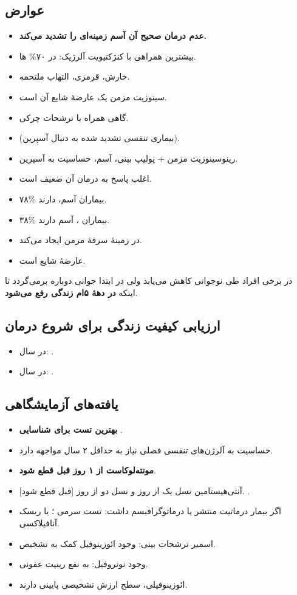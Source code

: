 \documentclass[12pt,a4paper]{article}
\begin{document}
\subsection*{عوارض }
\begin{itemize}
\item \textbf{عدم درمان صحیح آن آسم زمینه‌ای را تشدید می‌کند.}
\item بیشترین همراهی با کنژکتیویت آلرژیک: در ۷۰\% ها.
\item خارش، قرمزی، التهاب ملتحمه.
\item سینوزیت مزمن یک عارضهٔ شایع آن است.
\item گاهی همراه با ترشحات چرکی.
\item \textbf{} (بیماری تنفسی تشدید شده به دنبال آسپرین).
\item رینوسینوزیت مزمن + پولیپ بینی، آسم، حساسیت به آسپرین.
\item اغلب پاسخ به درمان آن ضعیف است.
\item ۷۸\% بیماران آسم،  دارند.
\item ۳۸\% بیماران ، آسم دارند.
\item {} در زمینهٔ  سرفهٔ مزمن ایجاد می‌کند.
\item {} عارضهٔ شایع  است.
\end{itemize}
 در برخی افراد طی نوجوانی کاهش می‌یابد ولی در ابتدا جوانی دوباره برمی‌گردد تا اینکه \textbf{در دههٔ ۵ام زندگی رفع می‌شود}.
\subsection*{ارزیابی کیفیت زندگی برای شروع درمان}
\begin{itemize}
\item در  سال: .
\item در  سال: .
\end{itemize}

\subsection*{یافته‌های آزمایشگاهی}
\begin{itemize}
\item \textbf{ بهترین تست برای شناسایی }.
\item حساسیت به آلرژن‌های تنفسی فصلی نیاز به حداقل ۲ سال مواجهه دارد.
\item \textbf{مونته‌لوکاست از ۱ روز قبل قطع شود}.
\item آنتی‌هیستامین نسل یک از  روز و نسل دو از  روز [قبل قطع شود]. .
\item اگر بیمار درماتیت منتشر یا درماتوگرافیسم داشت: تست سرمی ؛ یا ریسک آنافیلاکسی.
\item اسمیر ترشحات بینی: وجود ائوزینوفیل کمک به تشخیص.
\item وجود نوتروفیل: به نفع رینیت عفونی.
\item ائوزینوفیلی، سطح  ارزش تشخیصی پایینی دارند.
\end{itemize}
\end{document}
